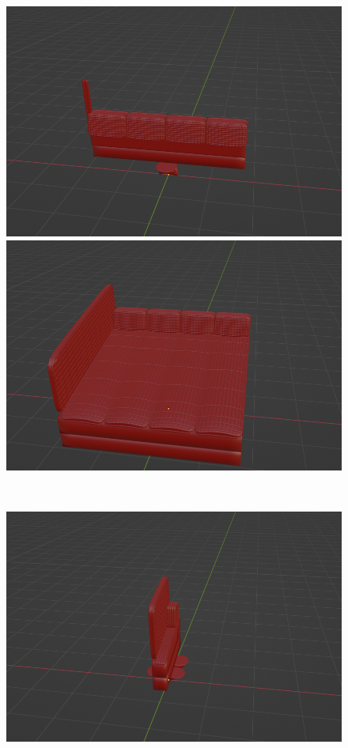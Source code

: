 \begin{figure}[h]
 \begin{minipage}[b]{0.48\linewidth}
  \centering
  \includegraphics[scale=0.17]{./imgs/sofaParamMean/depthMin.png}
 \end{minipage}
 \begin{minipage}[b]{0.48\linewidth}
  \centering
  \includegraphics[scale=0.17]{./imgs/sofaParamMean/depthMax.png}
 \end{minipage}\\
  \begin{minipage}[b]{0.48\linewidth}
  \centering
  \includegraphics[scale=0.17]{./imgs/sofaParamMean/widthMin.png}

\end{minipage}
\end{figure}
